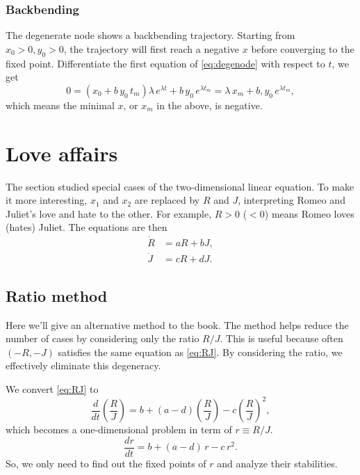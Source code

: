 \documentclass{book}
\begin{document}
\subsubsection{Backbending}

The degenerate node shows a backbending trajectory.  Starting from $x_0 > 0, y_0 > 0$, the trajectory will first reach a negative $x$ before converging to the fixed point.
Differentiate the first equation of \eqref{eq:degenode} with respect to $t$, we get
$$
0 = (x_0 + b \, y_0 \, t_m) \lambda \, e^{\lambda t} + b \, y_0 \, e^{\lambda t_m}
= \lambda \, x_m + b , y_0 \, e^{\lambda t_m},
$$
which means the minimal $x$, or $x_m$ in the above, is negative.


\section{Love affairs}

The section studied special cases of the two-dimensional linear equation.
To make it more interesting, $x_1$ and $x_2$ are replaced by $R$ and $J$,
interpreting Romeo and Juliet's love and hate to the other.
For example, $R > 0$ ($< 0$) means Romeo loves (hates) Juliet.
The equations are then
\begin{equation}
\begin{aligned}
  \dot R &= a R + b J, \\
  \dot J &= c R + d J.
\end{aligned}
\label{eq:RJ}
\end{equation}



\subsection{Ratio method}

Here we'll give an alternative method to the book.
The method helps reduce the number of cases by considering only the ratio $R/J$.
This is useful because often $(-R, -J)$ satisfies the same equation
as \eqref{eq:RJ}.
By considering the ratio, we effectively eliminate this degeneracy.


We convert \eqref{eq:RJ} to
\begin{equation}
  \frac{d}{dt} \left( \frac R J \right)
  =
  b + (a - d) \left( \frac R J \right) - c \left( \frac R J  \right)^2,
  \label{eq:RoverJ}
\end{equation}
which becomes a one-dimensional problem in term of $r \equiv R/J$.
\begin{equation}
  \frac{dr}{dt}
  =
  b + (a - d) \, r - c \, r^2.
  \label{eq:diffeq_r}
\end{equation}
So, we only need to find out the fixed points of $r$
and analyze their stabilities.
\end{document}
